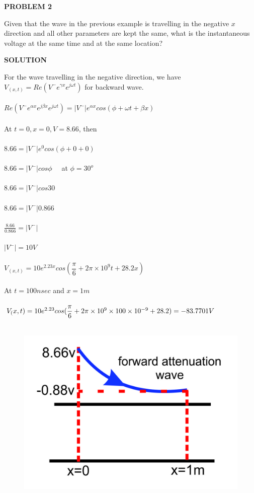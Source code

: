 \begin{exmp}
\begin{center}
\textbf{PROBLEM 2}
\end{center}
Given that the wave in the previous example is travelling in the negative ${x}$ direction and all other parameters are kept the same, what is the instantaneous voltage at the same time and at the same location?\\
\begin{center}
\textbf{SOLUTION}
\end{center}
For the wave travelling in the negative direction, we have\\
$V_{(x,t)} = Re(V^{-}e^{\gamma x}e^{j\omega t})$ for backward wave.\\\\
$Re({V^{-}e^{\alpha x}e^{j\beta x}e^{j\omega t}}) = {|V^{-}|e^{\alpha x}cos{(\phi+\omega t + \beta x)}}$\\\\
At ${t=0, x=0, V=8.66}$, then\\\\
${8.66} = {|V^{-}|}e^{0} cos({\phi + 0 + 0})$\\\\
$8.66 = {|V^-|{cos\phi}} \quad$ at $ \phi = 30^{o} $\\\\
$8.66 = {|V^-|{cos30}}$\\\\
$8.66 = {|V^-|{0.866}}$\\\\
$\frac{8.66}{0.866} = {|V^-|}$\\\\
${|V^{-}|} = 10V$\\\\
$V_({x,t}) = 10e^{2.23x} cos({\dfrac{\pi}{6} + 2\pi\times10^9t + 28.2x})$\\\\
At ${t=100nsec}$ and ${x=1m}$\\\\
$V_({x,t}) = 10e^{2.23} cos({\dfrac{\pi}{6} + 2\pi\times10^9\times100\times10^{-9} + 28.2})\\\\
= -83.7701V$\\\\
\begin{figure}[h!]
\centering
\includegraphics[scale=0.5]{./graphics/Group98}

\end{figure}
\end{exmp}
